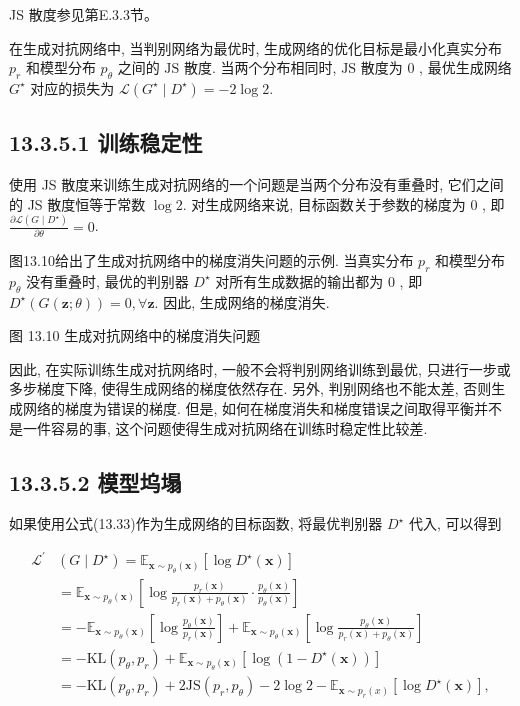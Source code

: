 \documentclass[10pt]{article}
\begin{document}
JS 散度参见第E.3.3节。

在生成对抗网络中, 当判别网络为最优时, 生成网络的优化目标是最小化真实分布 $p_{r}$ 和模型分布 $p_{\theta}$ 之间的 $\mathrm{JS}$ 散度. 当两个分布相同时, $\mathrm{JS}$ 散度为 0 , 最优生成网络 $G^{\star}$ 对应的损失为 $\mathcal{L}\left(G^{\star} \mid D^{\star}\right)=-2 \log 2$.

\subsection*{13.3.5.1 训练稳定性}
使用 JS 散度来训练生成对抗网络的一个问题是当两个分布没有重叠时, 它们之间的 JS 散度恒等于常数 $\log 2$. 对生成网络来说, 目标函数关于参数的梯度为 0 , 即 $\frac{\partial \mathcal{L}\left(G \mid D^{\star}\right)}{\partial \theta}=0$.

图13.10给出了生成对抗网络中的梯度消失问题的示例. 当真实分布 $p_{r}$ 和模型分布 $p_{\theta}$ 没有重叠时, 最优的判别器 $D^{\star}$ 对所有生成数据的输出都为 0 , 即 $D^{\star}(G(\boldsymbol{z} ; \theta))=0, \forall \boldsymbol{z}$. 因此, 生成网络的梯度消失.



图 13.10 生成对抗网络中的梯度消失问题

因此, 在实际训练生成对抗网络时, 一般不会将判别网络训练到最优, 只进行一步或多步梯度下降, 使得生成网络的梯度依然存在. 另外, 判别网络也不能太差, 否则生成网络的梯度为错误的梯度. 但是, 如何在梯度消失和梯度错误之间取得平衡并不是一件容易的事, 这个问题使得生成对抗网络在训练时稳定性比较差.

\subsection*{13.3.5.2 模型坞塌}
如果使用公式(13.33)作为生成网络的目标函数, 将最优判别器 $D^{\star}$ 代入, 可以得到


\begin{align*}
\mathcal{L}^{\prime} & \left(G \mid D^{\star}\right)=\mathbb{E}_{\boldsymbol{x} \sim p_{\theta}(\boldsymbol{x})}\left[\log D^{\star}(\boldsymbol{x})\right]  \tag{13.42}\\
& =\mathbb{E}_{\boldsymbol{x} \sim p_{\theta}(\boldsymbol{x})}\left[\log \frac{p_{r}(\boldsymbol{x})}{p_{r}(\boldsymbol{x})+p_{\theta}(\boldsymbol{x})} \cdot \frac{p_{\theta}(\boldsymbol{x})}{p_{\theta}(\boldsymbol{x})}\right]  \tag{13.43}\\
& =-\mathbb{E}_{\boldsymbol{x} \sim p_{\theta}(\boldsymbol{x})}\left[\log \frac{p_{\theta}(\boldsymbol{x})}{p_{r}(\boldsymbol{x})}\right]+\mathbb{E}_{\boldsymbol{x} \sim p_{\theta}(\boldsymbol{x})}\left[\log \frac{p_{\theta}(\boldsymbol{x})}{p_{r}(\boldsymbol{x})+p_{\theta}(\boldsymbol{x})}\right]  \tag{13.44}\\
& =-\mathrm{KL}\left(p_{\theta}, p_{r}\right)+\mathbb{E}_{\boldsymbol{x} \sim p_{\theta}(\boldsymbol{x})}\left[\log \left(1-D^{\star}(\boldsymbol{x})\right)\right]  \tag{13.45}\\
& =-\mathrm{KL}\left(p_{\theta}, p_{r}\right)+2 \mathrm{JS}\left(p_{r}, p_{\theta}\right)-2 \log 2-\mathbb{E}_{\boldsymbol{x} \sim p_{r}(x)}\left[\log D^{\star}(\boldsymbol{x})\right], \tag{13.46}
\end{align*}
\end{document}
